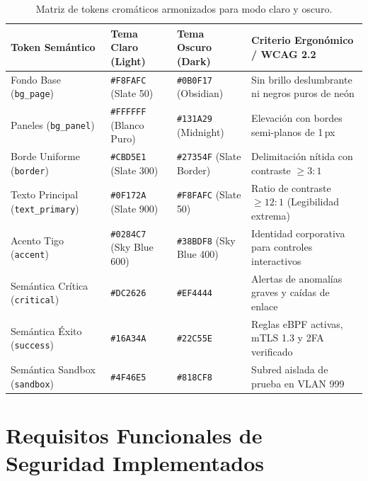 \documentclass[11pt,a4paper]{article}
\begin{document}
\begin{table}[h!]
\centering\small
\begin{tabularx}{\textwidth}{lXXX}
\toprule
\textbf{Token Semántico} & \textbf{Tema Claro (Light)} & \textbf{Tema Oscuro (Dark)} & \textbf{Criterio Ergonómico / WCAG 2.2} \\
\midrule
Fondo Base (\texttt{bg\_page}) & \texttt{\#F8FAFC} (Slate 50) & \texttt{\#0B0F17} (Obsidian) & Sin brillo deslumbrante ni negros puros de neón \\
Paneles (\texttt{bg\_panel}) & \texttt{\#FFFFFF} (Blanco Puro) & \texttt{\#131A29} (Midnight) & Elevación con bordes semi-planos de 1\,px \\
Borde Uniforme (\texttt{border}) & \texttt{\#CBD5E1} (Slate 300) & \texttt{\#27354F} (Slate Border) & Delimitación nítida con contraste $\ge 3:1$ \\
Texto Principal (\texttt{text\_primary}) & \texttt{\#0F172A} (Slate 900) & \texttt{\#F8FAFC} (Slate 50) & Ratio de contraste $\ge 12:1$ (Legibilidad extrema) \\
Acento Tigo (\texttt{accent}) & \texttt{\#0284C7} (Sky Blue 600) & \texttt{\#38BDF8} (Sky Blue 400) & Identidad corporativa para controles interactivos \\
Semántica Crítica (\texttt{critical}) & \texttt{\#DC2626} & \texttt{\#EF4444} & Alertas de anomalías graves y caídas de enlace \\
Semántica Éxito (\texttt{success}) & \texttt{\#16A34A} & \texttt{\#22C55E} & Reglas eBPF activas, mTLS 1.3 y 2FA verificado \\
Semántica Sandbox (\texttt{sandbox}) & \texttt{\#4F46E5} & \texttt{\#818CF8} & Subred aislada de prueba en VLAN 999 \\
\bottomrule
\end{tabularx}
\caption{Matriz de tokens cromáticos armonizados para modo claro y oscuro.}
\end{table}

\newpage

\section{Requisitos Funcionales de Seguridad Implementados}
\end{document}
